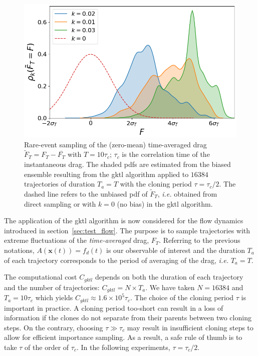 \documentclass[pre,aps,floatfix,10pt,superscriptaddress, notitlepage,preprint]{revtex4-1}
\begin{document}
\begin{figure}
	\centering
	\includegraphics[width=0.7\linewidth]{IS_GKTL/IS_GKTL}
	\caption{\label{fig:IS_GKTL} Rare-event sampling of the (zero-mean) time-averaged drag $\tilde F_T = F_T - \overline{F_T}$ with $T=10\tau_c$; $\tau_c$ is the correlation time of the instantaneous drag. The shaded \ac{pdf}s are estimated from the biased ensemble resulting from the \ac{gktl} algorithm applied to $16384$ trajectories of duration $T_a=T$ with the cloning period $\tau=\tau_c/2$.
	The dashed line refers to the unbiased \ac{pdf} of $\tilde F_T$, \textit{i.e.} obtained from direct sampling or with $k=0$ (no bias) in the \ac{gktl} algorithm.
}
\end{figure}

The application of the \ac{gktl} algorithm is now considered for the flow dynamics introduced in section~\ref{sec:test_flow}. The purpose is to sample trajectories with extreme fluctuations of the \textit{time-averaged} drag, $F_T$. {Referring to the previous notations, $A(\mathbf{x}(t))=f_d(t)$ is our observable of interest and the duration $T_a$ of each trajectory corresponds to the period of averaging of the drag, \emph{i.e.} $T_a=T$.}    

The computational cost $C_{{gktl}}$ depends on both the duration of each trajectory and the number of trajectories: $C_{gktl} = N \times T_a$.
We have taken $N=16384$ and $T_a = 10\tau_c$ which yields $C_{gktl} \approx 1.6 \times 10^5 \tau_c$. The choice of the cloning period $\tau$ is important in practice.
A  cloning period too-short can result in a loss of information if the clones do not separate from their parents between two cloning steps. On the contrary, choosing $\tau \gg \tau_c$ may result in insufficient cloning steps to allow for efficient importance sampling.
As a result, a safe rule of thumb is to take $\tau$ of the order of $\tau_c$.
In the following experiments, $\tau = \tau_c /2$. 
%
\end{document}
